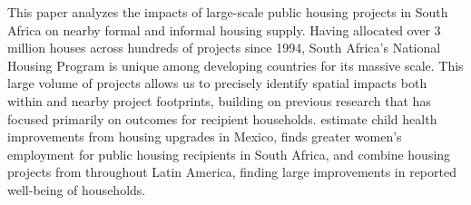 \documentclass[12pt]{article}
\begin{document}



This paper analyzes the impacts of large-scale public housing projects in South Africa on nearby formal and informal housing supply.  Having allocated over 3 million houses across hundreds of projects since 1994, South Africa's National Housing Program is unique among developing countries for its massive scale.  This large volume of projects allows us to precisely identify spatial impacts both within and nearby project footprints, building on previous research that has focused primarily on outcomes for recipient households.  \cite{cattaneo2009housing} estimate child health improvements from housing upgrades in Mexico, \cite{franklin2016enabled} finds greater women's employment for public housing recipients in South Africa, and \cite{galiani2017shelter} combine housing projects from throughout Latin America, finding large improvements in reported well-being of households.
\end{document}

